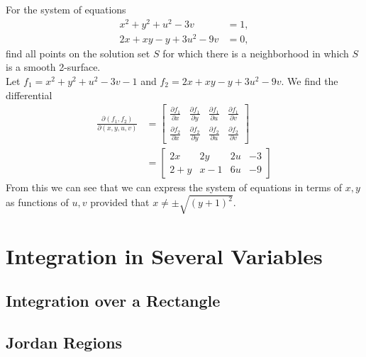 \documentclass[12pt]{book}
\newenvironment{exercise}[2][Exercise]{\begin{trivlist}
\item[\hskip \labelsep {\bfseries #1}\hskip \labelsep {\bfseries #2.}]}{\end{trivlist}}
\begin{document}
\begin{exercise}{9.7.8}
    For the system of equations
    \begin{align*}
        x^2 + y^2 + u^2 - 3 v &= 1, \\
        2 x + x y - y + 3 u^2 - 9 v &= 0,
    \end{align*}
    find all points on the solution set $S$ for which there is a neighborhood in which $S$ is a smooth 2-surface.  \\
    
    Let $f_1 = x^2+y^2+u^2-3v-1$ and $f_2= 2x + xy - y + 3u^2 - 9v$. We find the differential
    \begin{align*}
    \frac{\partial (f_1,f_2)}{\partial(x,y,u,v)} &= \begin{bmatrix} \frac{\partial f_1}{\partial x} & \frac{\partial f_1}{\partial y} & \frac{\partial f_1}{\partial u} & \frac{\partial f_1}{\partial v} \\ \frac{\partial f_2}{\partial x} & \frac{\partial f_2}{\partial y} & \frac{\partial f_2}{\partial u} & \frac{\partial f_2}{\partial v}  \end{bmatrix} \\
                                                 &= \begin{bmatrix} 2x & 2y & 2u & -3 \\ 2+y & x-1 & 6u & -9 \end{bmatrix}
    \end{align*}
    From this we can see that we can express the system of equations in terms of $x,y$ as functions of $u,v$ provided that $x \neq \pm \sqrt{ (y+1)^2}$.

\end{exercise}






\chapter{Integration in Several Variables}
\section{Integration over a Rectangle}


\section{Jordan Regions}
\end{document}
